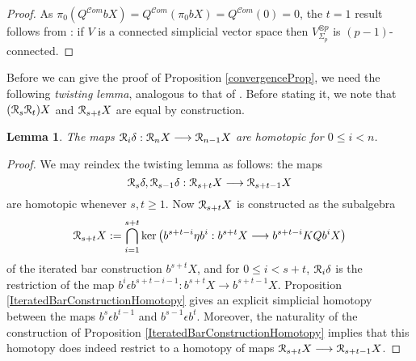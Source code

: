 \documentclass[11pt]{amsart} \renewcommand{\baselinestretch}{1.4}
\theoremstyle{plain}
\newtheorem{lem}[thm]{Lemma}
\theoremstyle{definition}
\renewcommand{\ker}{\mathrm{ker}\,}
\renewcommand{\to}{\longrightarrow}
\newcommand{\scrC}{\mathscr{C}}
\newcommand{\calR}{\mathcal{R}}
\newcommand{\algs}{{\scrC\!\textit{om}}}
\newcommand{\caldup}[1]{\calR_{\smash{#1}}}
\newcommand{\barConstructionMightAbbreviate}{b}
\begin{document}
\begin{Bousfield-Kan spectral sequence}
\begin{proof}
%
As $\pi_0(Q^{\algs}\barConstructionMightAbbreviate X)=Q^{\algs}(\pi_0\barConstructionMightAbbreviate X)=Q^{\algs}(0)=0$, %
the $t=1$ result follows from \cite[Satz 12.1]{DoldPuppeSuspension.pdf}: if $V$ is a connected simplicial vector space then $V^{\otimes p}_{\Sigma_p}$ is $(p-1)$-connected. 
\end{proof}
Before we can give the proof of Proposition \ref{convergenceProp}, we need the following \emph{twisting lemma}, analogous to that of \cite{BK_pairings.pdf}. Before stating it, we note that $(\caldup{s}\caldup{t})X$ and $\caldup{s+t}X$ are equal by construction.
\begin{lem}
\label{DsDt=Dt+s}
The maps $\caldup{i}\delta:\caldup{n}X\to \caldup{n-1}X$ are homotopic for $0\leq i< n$.
\end{lem}
\begin{proof}
We may reindex the twisting lemma as follows: the maps 
\[\caldup{s}\delta,\caldup{s-1}\delta:\caldup{s+t}X\to \caldup{s+t-1}X\]
are homotopic whenever $s,t\geq1$. Now $\caldup{s+t}X$ is constructed as the subalgebra
\[\caldup{s+t}X:= \bigcap_{i=1}^{s+t}\ker\!\left(\barConstructionMightAbbreviate^{s+t-i}\eta \barConstructionMightAbbreviate^{i}:\barConstructionMightAbbreviate^{s+t}X\to \barConstructionMightAbbreviate^{s+t-i}KQ\barConstructionMightAbbreviate^{i}X\right)\]
of the iterated bar construction $\barConstructionMightAbbreviate^{s+t}X$, and for $0\leq i<s+t$, $\caldup{i}\delta$ is the restriction of the map $\barConstructionMightAbbreviate^i\epsilon \barConstructionMightAbbreviate^{s+t-i-1}:\barConstructionMightAbbreviate^{s+t}X\to \barConstructionMightAbbreviate^{s+t-1}X$.
Proposition \ref{IteratedBarConstructionHomotopy} gives an explicit simplicial homotopy between the maps $\barConstructionMightAbbreviate^s\epsilon \barConstructionMightAbbreviate^{t-1}$ and $\barConstructionMightAbbreviate^{s-1}\epsilon \barConstructionMightAbbreviate^{t}$. Moreover, the naturality of the construction of Proposition \ref{IteratedBarConstructionHomotopy} implies that this homotopy does indeed restrict to a homotopy of maps $\caldup{s+t}X\to \caldup{s+t-1}X$.
\end{proof}



\end{Bousfield-Kan spectral sequence}
\end{document}
